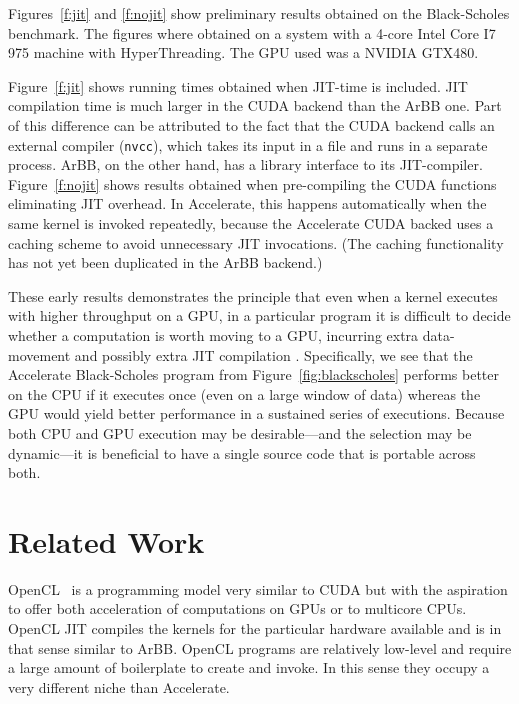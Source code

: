 \documentclass[conference]{IEEEtran}
\newcommand{\cde}[1]{{\footnotesize \tt #1}}
\newcommand{\systemname}[0]{{Harbb}}
\begin{document}
Figures~\ref{f:jit} and \ref{f:nojit} show preliminary results obtained on 
the Black-Scholes benchmark. The figures where obtained on a system with a 4-core 
Intel Core I7 975 machine with HyperThreading. The GPU used was a NVIDIA GTX480.

Figure~\ref{f:jit} shows running times obtained when JIT-time is included. 
JIT compilation time is much larger 
in the CUDA backend than the ArBB one.  Part of this difference 
can be attributed to the fact that 
the CUDA backend calls an external compiler (\cde{nvcc}), which takes its input in a file and runs in
a separate process.  ArBB, on the other hand, has a library interface to its  JIT-compiler. 
Figure~\ref{f:nojit} shows results obtained when pre-compiling the
CUDA functions eliminating JIT overhead.
In Accelerate, this happens automatically when the same kernel is
invoked repeatedly, because the Accelerate CUDA backed 
uses a caching scheme to avoid unnecessary JIT invocations.  (The
caching functionality has not yet been duplicated in the 
ArBB backend.)

These early results demonstrates the principle that even when a kernel
executes with higher throughput on a GPU, in a particular program it
is difficult to decide whether a computation is worth moving to a GPU,
incurring extra data-movement and possibly extra JIT compilation
\cite{wheres-the-data-paper}.  Specifically, we see that the
Accelerate Black-Scholes program from Figure~\ref{fig:blackscholes}
performs better on the CPU if it executes once (even on a large window
of data) whereas the GPU would yield better performance in a sustained
series of executions.
%
Because both CPU and GPU execution may be desirable---and the
selection may be dynamic---it is beneficial to have a single source code
that is portable across both.  


\section{Related Work}


OpenCL~\cite{opencl08} is a programming model very similar to CUDA but with the aspiration 
to offer both acceleration of computations on GPUs or to multicore CPUs. 
OpenCL JIT compiles the kernels for the particular hardware available and is
in that sense similar to ArBB.  
OpenCL programs are relatively low-level and require a large amount of
boilerplate to create and invoke.  In this sense they occupy a very
different niche than Accelerate.
\end{document}
